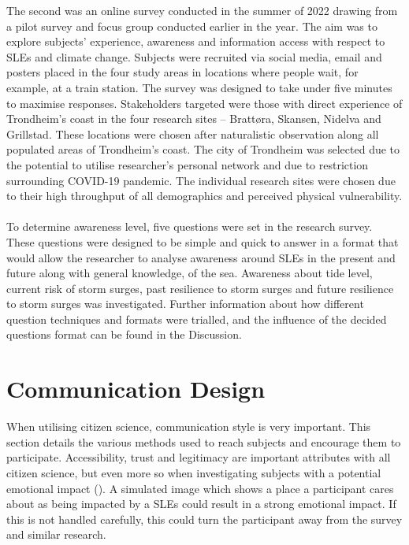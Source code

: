 The second was an online survey conducted in the summer of 2022 drawing from a pilot survey and focus group conducted earlier in the year. The aim was to explore subjects' experience, awareness and information access with respect to SLEs and climate change. Subjects were recruited via social media, email and posters placed in the four study areas in locations where people wait, for example, at a train station. The survey was designed to take under five minutes to maximise responses. Stakeholders targeted were those with direct experience of Trondheim’s coast in the four research sites – Brattøra, Skansen, Nidelva and Grillstad. These locations were chosen after naturalistic observation along all populated areas of Trondheim’s coast. The city of Trondheim was selected due to the potential to utilise researcher's personal network and due to restriction surrounding COVID-19 pandemic. The individual research sites were chosen due to their high throughput of all demographics and perceived physical vulnerability.

\paragraph{}
To determine awareness level, five questions were set in the research survey. These questions were designed to be simple and quick to answer in a format that would allow the researcher to analyse awareness around SLEs in the present and future along with general knowledge, of the sea. Awareness about tide level, current risk of storm surges, past resilience to storm surges and future resilience to storm surges was investigated. Further information about how different question techniques and formats were trialled, and the influence of the decided questions format can be found in the Discussion.



\section{Communication Design}

When utilising citizen science, communication style is very important. This section details the various methods used to reach subjects and encourage them to participate. Accessibility, trust and legitimacy are important attributes with all citizen science, but even more so when investigating subjects with a potential emotional impact (\cite{tweddle_guide_2012}). A simulated image which shows a place a participant cares about as being impacted by a SLEs could result in a strong emotional impact. If this is not handled carefully, this could turn the participant away from the survey and similar research.
